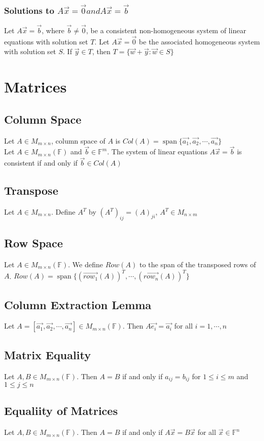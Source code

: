 \documentclass[12pt, letterpaper]{article}
\DeclareMathOperator{\spn}{span}
\begin{document}
\subsubsection{Solutions to $A\vec{x}=\vec{0} and A\vec{x}=\vec{b}$}
Let $A\vec{x}=\vec{b}$, where $\vec{b}\neq\vec{0}$, be a consistent non-homogeneous system of linear equations with solution set $T$. Let 
$A\vec{x} = \vec{0}$ be the associated homogeneous system with solution set $S$. If $\vec{y}\in T$, then 
$T = \{\vec{w} + \vec{y}: \vec{w}\in S\}$ 

\section{Matrices}
\subsection{Column Space}
Let $A\in M_{m\times n}$, column space of $A$ is $Col(A) = \spn\{\vec{a_1}, \vec{a_2}, \cdots, \vec{a_n}\}$ \\
Let $A\in M_{m\times n} (\mathbb{F})$ and $\vec{b}\in\mathbb{F}^m$. The system of linear equations $A\vec{x}=\vec{b}$ is consistent if and only if $\vec{b}\in Col(A)$
\subsection{Transpose}
Let $A\in M_{m\times n}$. Define $A^T$ by $(A^T)_{ij} = (A)_{ji}$, $A^T\in M_{n\times m}$
\subsection{Row Space}
Let $A\in M_{m\times n} (\mathbb{F})$. We define $Row(A)$ to the span of the transposed rows of $A$. $Row(A) = \spn\{(\vec{row_1}(A))^T, \cdots, (\vec{row_n}(A))^T\}$
\subsection{Column Extraction Lemma}
Let $A = [\vec{a_1}, \vec{a_2}, \cdots, \vec{a_n}] \in M_{m\times n}(\mathbb{F})$. Then $A\vec{e_i} = \vec{a_i}$ for all $i = 1, \cdots, n$
\subsection{Matrix Equality}
Let $A,B\in M_{m\times n}(\mathbb{F})$. Then $A=B$ if and only if $a_{ij} = b_{ij}$ for $1\leq i\leq m$ and $1\leq j\leq n$
\subsection{Equaliity of Matrices}
Let $A,B\in M_{m\times n}(\mathbb{F})$. Then $A=B$ if and only if $A\vec{x} = B\vec{x}$ for all $\vec{x}\in\mathbb{F}^n$
\end{document}
